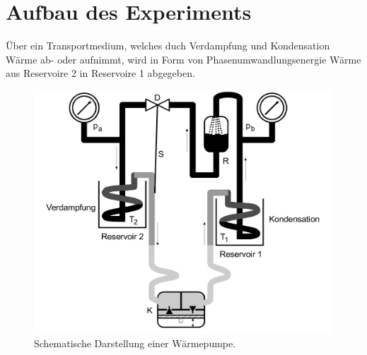 \documentclass{scrartcl} %
\begin{document}
\section{Aufbau des Experiments}
  Über ein Transportmedium, welches duch Verdampfung und Kondensation Wärme ab- oder aufnimmt,
  wird in Form von Phasenumwandlungsenergie Wärme aus Reservoire 2 in Reservoire 1 abgegeben.
  \begin{figure}
    \centering
    \includegraphics[scale = 0.15]{AufbauWaermepumpe.png}
    \caption{Schematische Darstellung einer Wärmepumpe.}
    \label{fig:wärmepumpe1}
  \end{figure}
\end{document}
